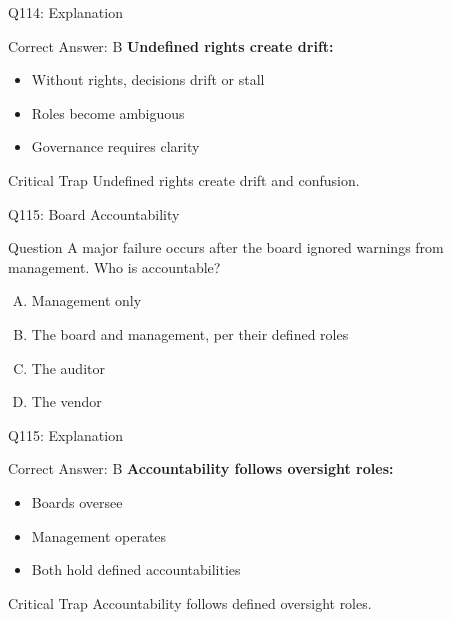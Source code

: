 \documentclass{beamer}
\begin{document}
	\begin{frame}{Q114: Explanation}
		\begin{block}{Correct Answer: B}
			\textbf{Undefined rights create drift:}
			\begin{itemize}
				\item Without rights, decisions drift or stall
				\item Roles become ambiguous
				\item Governance requires clarity
			\end{itemize}
		\end{block}
		\begin{alertblock}{Critical Trap}
			Undefined rights create drift and confusion.
		\end{alertblock}
	\end{frame}
	
	\begin{frame}{Q115: Board Accountability}
		\begin{block}{Question}
			A major failure occurs after the board ignored warnings from management. Who is accountable?
		\end{block}
		\begin{enumerate}[(A)]
			\item Management only
			\item The board and management, per their defined roles
			\item The auditor
			\item The vendor
		\end{enumerate}
	\end{frame}
	
	\begin{frame}{Q115: Explanation}
		\begin{block}{Correct Answer: B}
			\textbf{Accountability follows oversight roles:}
			\begin{itemize}
				\item Boards oversee
				\item Management operates
				\item Both hold defined accountabilities
			\end{itemize}
		\end{block}
		\begin{alertblock}{Critical Trap}
			Accountability follows defined oversight roles.
		\end{alertblock}
	\end{frame}
	
\end{document}
